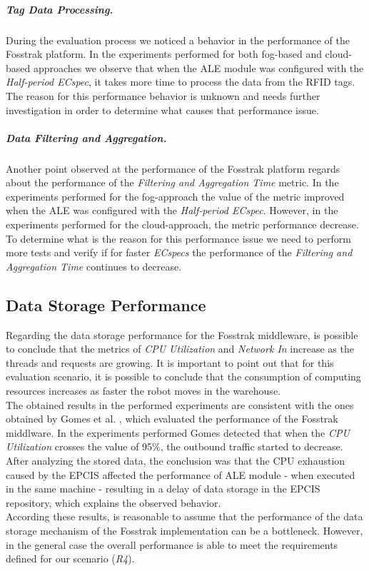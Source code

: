         \subparagraph{Tag Data Processing.}
        \label{subp:eval_tag_processing}
        During the evaluation process we noticed a behavior in the performance of the Fosstrak platform.
        In the experiments performed for both fog-based and cloud-based approaches we observe that when
        the \gls{ALE} module was configured with the \textit{Half-period ECspec}, it takes more time to
        process the data from the \gls{RFID} tags. The reason for this performance behavior is unknown and
        needs further investigation in order to determine what causes that performance issue.

        \subparagraph{Data Filtering and Aggregation.}
        \label{subp:data_filtering_aggregation}
        Another point observed at the performance of the Fosstrak platform regards about the performance
        of the \textit{Filtering and Aggregation Time} metric. In the experiments performed for the
        fog-approach the value of the metric improved when the \gls{ALE} was configured with the
        \textit{Half-period ECspec}. However, in the experiments performed for the cloud-approach, the
        metric performance decrease. To determine what is the reason for this performance issue we need
        to perform more tests and verify if for faster \textit{ECspecs} the performance of the
        \textit{Filtering and Aggregation Time} continues to decrease.

        \subsection{Data Storage Performance}
        \label{subs:eval_results_data}
        Regarding the data storage performance for the Fosstrak middleware, is possible to conclude that the metrics
        of \textit{CPU Utilization} and \textit{Network In} increase as the threads and requests are growing.
        It is important to point out that for this evaluation scenario, it is possible to conclude that the
        consumption of computing resources increases as faster the robot moves in the warehouse.\\

        The obtained results in the performed experiments are consistent with the ones obtained by Gomes
        et al. \cite{gomes2014future}, which evaluated the performance of the Fosstrak middlware. In the experiments
        performed Gomes detected that when the \textit{CPU Utilization} crosses the value of 95$\%$, the outbound
        traffic started to decrease. After analyzing the stored data, the conclusion was that the \gls{CPU} exhaustion
        caused by the \gls{EPCIS} affected the performance of \gls{ALE} module - when executed in the same
        machine - resulting in a delay of data storage in the \gls{EPCIS} repository, which explains the
        observed behavior.\\

        According these results, is reasonable to assume that the performance of the data storage mechanism of
        the Fosstrak implementation can be a bottleneck. However, in the general case the overall performance
        is able to meet the requirements defined for our scenario (\textit{R4}).

